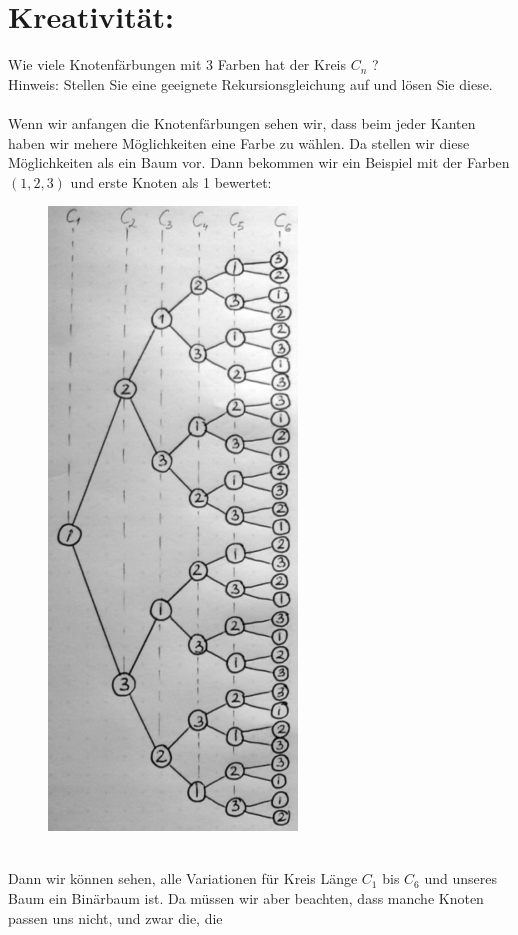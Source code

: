     \section*{Kreativität:} Wie viele Knotenfärbungen mit 3 Farben hat der Kreis $C_n$ ?\\
        Hinweis: Stellen Sie eine geeignete Rekursionsgleichung auf und lösen Sie diese.\\\\
        Wenn wir anfangen die Knotenfärbungen sehen wir, dass beim jeder Kanten haben wir mehere 
        Möglichkeiten eine Farbe zu wählen. Da stellen wir diese Möglichkeiten als ein Baum vor. 
        Dann bekommen wir ein Beispiel mit der Farben $(1,2,3)$ und erste Knoten als 1 bewertet:
        \begin{figure}
            \includegraphics[width=1\linewidth]{baum_kreativ}
        \end{figure}\\
        Dann wir können sehen, alle Variationen für Kreis Länge $C_1$ bis $C_6$ und unseres Baum ein 
        Binärbaum ist. Da müssen wir aber beachten, dass manche Knoten passen uns nicht, und zwar die, 
        die 